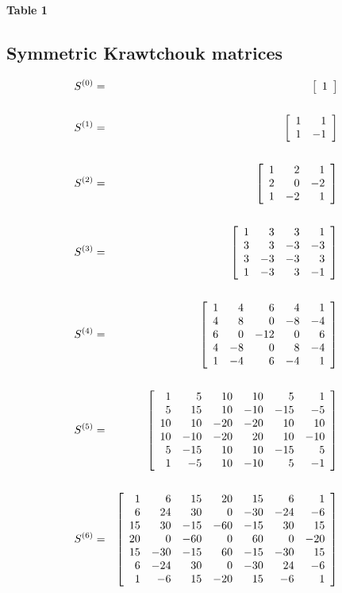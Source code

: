 \documentclass[12pt]{article}
\numberwithin{equation}{section}
\begin{document}
\centerline{{\bf Table 1}}

\newpage
\subsection{Symmetric Krawtchouk matrices}
\begin{eqnarray*}
%
S^{(0)}&=&\left[\begin{array}{r} 1 \end{array}\right]
\\
\\
S^{(1)}&=&\left[\begin{array}{rr} 1 &  1 \cr
                        1 & -1 \cr\end{array}\right]
\\
\\
S^{(2)}&=& \left[\begin{array}{rrr}  1 &  2 &  1 \cr
                          2 &  0 & -2 \cr
                          1 & -2 &  1 \cr \end{array}\right]
\\
\\
S^{(3)}&=&
      \left[\begin{array}{rrrr} 1 &  3 &  3  &  1 \cr
                     3 &  3 & -3  & -3 \cr
                     3 & -3 & -3  &  3 \cr
                     1 & -3 &  3  & -1 \cr \end{array}\right]
\\
\\
S^{(4)}&=&
      \left[\begin{array}{rrrrr} 1 &  4 &  6  &  4  &  1 \cr
                     4 &  8 &  0  & -8  & -4 \cr
                     6 &  0 &-12  &  0  &  6 \cr
                     4 & -8 &  0  &  8  & -4 \cr
                     1 & -4 &  6  & -4  &  1 \cr \end{array}\right]
\\
\\
S^{(5)}&=&
      \left[\begin{array}{rrrrrr} 1  &  5 & 10 &  10  &   5 &   1 \cr
                     5  & 15 & 10 & -10  & -15 &  -5 \cr
                    10  & 10 &-20 & -20  &  10 &  10 \cr
                    10  &-10 &-20 &  20  &  10 & -10 \cr
                     5  &-15 & 10 &  10  & -15 &   5 \cr
                     1  & -5 & 10 & -10  &   5 &  -1 \cr \end{array}\right]
\\
\\
S^{(6)}&=&
       \left[\begin{array}{rrrrrrr} 1  &   6 &  15  &  20 &  15 &   6 &   1
\cr
                      6  &  24 &  30  &   0 & -30 & -24 &  -6 \cr
                     15  &  30 & -15  & -60 & -15 &  30 &  15 \cr
                     20  &   0 & -60  &   0 &  60 &   0 & -20 \cr
                     15  & -30 & -15  &  60 & -15 & -30 &  15 \cr
                      6  & -24 &  30  &   0 & -30 &  24 &  -6 \cr
                      1  &  -6 &  15  & -20 &  15 &  -6 &   1 \cr
\end{array}\right]
\end{eqnarray*}
\end{document}
